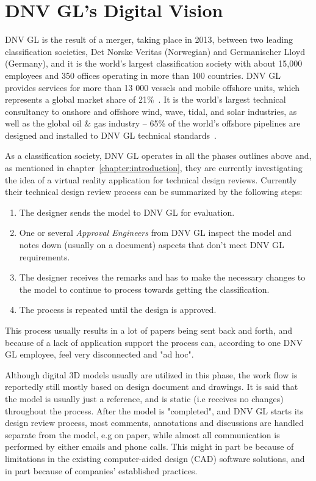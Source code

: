 \section{DNV GL's Digital Vision}
DNV GL is the result of a merger, taking place in 2013, between two leading classification societies, Det Norske Veritas (Norwegian) and Germanischer Lloyd (Germany),
and it is the world's largest classification society with about 15,000 employees and 350 offices operating in more than 100 countries. 
DNV GL provides services for more than 13 000 vessels and mobile offshore units, which represents a global market share of 21\%~\citep{TO:DNVGL}.
It is the world's largest technical consultancy to onshore and offshore wind, wave, tidal, and solar industries, as well as the global oil \& gas industry 
-- 65\% of the world’s offshore pipelines are designed and installed to DNV GL technical standards~\citep{MTN:DNVGL}. 

As a classification society, DNV GL operates in all the phases outlines above and, as mentioned in chapter~\vref{chapter:introduction}, they are 
currently investigating the idea of a virtual reality application for technical design reviews. 
Currently their technical design review process can be summarized by the following steps: 

\begin{enumerate}
	\item The designer sends the model to DNV GL for evaluation.
	\item One or several \textit{Approval Engineers} from DNV GL inspect the model and notes down (usually on a document) aspects that don't meet DNV GL requirements.
	\item The designer receives the remarks and has to make the necessary changes to the model to continue to process towards getting the classification.
	\item The process is repeated until the design is approved.
\end{enumerate}

This process usually results in a lot of papers being sent back and forth, and because of a lack of application support the process can, according to one DNV GL employee,
feel very disconnected and "ad hoc". 

Although digital 3D models usually are utilized in this phase, the work flow is reportedly still mostly based on design document and drawings.  
It is said that the model is usually just a reference, and is static (i.e receives no changes) throughout the process. After the model is "completed", and DNV GL starts
its design review process, most comments, annotations and discussions are handled separate from the model, e.g on paper, while almost all communication
is performed by either emails and phone calls.
This might in part be because of limitations in the existing computer-aided design (CAD) software solutions, and in part because of companies' established practices.

